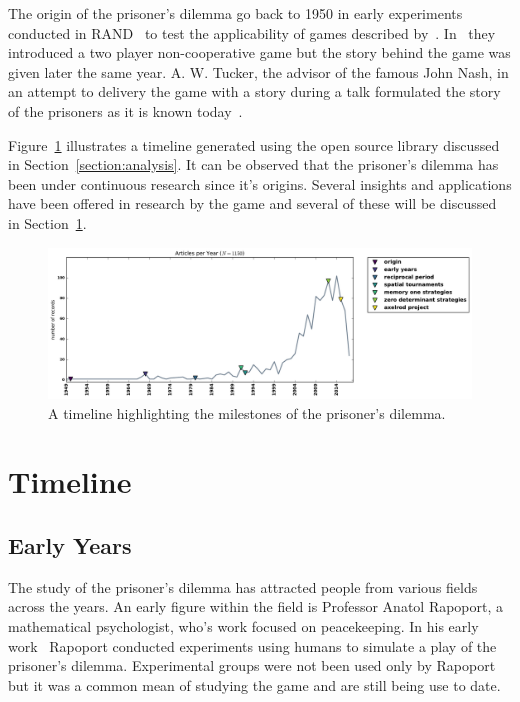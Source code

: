 \documentclass{article}
\begin{document}
The origin of the prisoner's dilemma go back to 1950 in early experiments
conducted in RAND~\cite{Flood1958} to test the applicability of games
described by~\cite{VonNeumann1944}. In~\cite{Flood1958} they introduced
a two player non-cooperative game but the story behind the game was
given later the same year. A. W. Tucker, the advisor of the famous John Nash, in
an attempt to delivery the game with a story during a talk formulated the story
of the prisoners as it is known today~\cite{Tucker1983}.

Figure~\ref{fig:timeline} illustrates a timeline generated using the open source 
library discussed in Section~\ref{section:analysis}. It can be observed that 
the prisoner's dilemma has been under continuous research since it's origins.
Several insights and applications have been offered in research by the game and
several of these will be discussed in Section~\ref{section:timeline}.

\begin{figure}[!htbp]
    \centering
    \includegraphics[width=\textwidth]{assets/images/timeline.pdf}
    \caption{\label{fig:timeline} A timeline highlighting the milestones of the 
    prisoner's dilemma.}
\end{figure}

\section{Timeline}\label{section:timeline}

\subsection{Early Years}
The study of the prisoner's dilemma has attracted people from various fields
across the years. An early figure within the field is Professor Anatol Rapoport,
a mathematical psychologist, who's work focused on peacekeeping.
In his early work~\cite{rapoport1965} Rapoport conducted experiments using humans
to simulate a play of the prisoner's dilemma. Experimental groups were not been
used only by Rapoport but it was a common mean of studying the game
\cite{Evans1966, Gallo1968, Lutzker1961, Mack1971, Sensenig1972} and are still
being use to date. %
\end{document}
